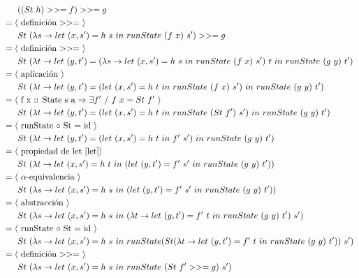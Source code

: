 \documentclass[a4paper,10pt]{article}
\begin{document}
  	\\
	\begin{align*}
  &\ \ \ \ \ ((St\ h) >>= f) >>= g
  \\ &=\langle \text{ definición $>>=$ }\rangle
  \\ &\ \ \ \ \ St\ (\lambda s \rightarrow let\ (x,s')=h\ s\ in\ runState\ (f\ x)\ s') >>= g
  \\ &=\langle \text{ definición $>>=$ }\rangle
  \\ &\ \ \ \ \ St\ (\lambda t \rightarrow let\ (y, t')=(\lambda s \rightarrow let\ (x,s')=h\ s\ in\ runState\ (f\ x)\ s')\ t\ in\ runState\ (g\ y)\ t')
  \\ &=\langle \text{ aplicación }\rangle
  \\ &\ \ \ \ \ St\ (\lambda t \rightarrow let\ (y, t')=(let\ (x,s')= h\ t\ in\ runState\ (f\ x)\ s')\ in\ runState\ (g\ y)\ t')
  \\ &=\langle \text{ f x :: State s a $\Rightarrow \exists f'\ /\  f\ x = St\ f'$ \label{sec:fxl}}\rangle
  \\ &\ \ \ \ \ St\ (\lambda t \rightarrow let\ (y, t')=(let\ (x,s')= h\ t\ in\ runState\ (St\ f')\ s')\ in\ runState\ (g\ y)\ t')
  \\ &=\langle \text{ runState $\circ$ St = id }\rangle
  \\ &\ \ \ \ \ St\ (\lambda t \rightarrow let\ (y, t')=(let\ (x,s')= h\ t\ in\ f'\ s')\ in\ runState\ (g\ y)\ t')
  \\ &=\langle \text{ propiedad de let \ref{let}}\rangle
  \\ &\ \ \ \ \ St\ (\lambda t \rightarrow let\ (x,s')= h\ t\ in\ (let\ (y, t')=f'\ s'\ in\ runState\ (g\ y)\ t'))
  \\ &=\langle \text{ $\alpha$-equivalencia }\rangle
  \\ &\ \ \ \ \ St\ (\lambda s \rightarrow let\ (x,s')= h\ s\ in\ (let\ (y, t')=f'\ s'\ in\ runState\ (g\ y)\ t'))
  \\ &=\langle \text{ abstracción }\rangle
  \\ &\ \ \ \ \ St\ (\lambda s \rightarrow let\ (x,s')= h\ s\ in\ (\lambda t\rightarrow let\ (y, t')=f'\ t\ in\ runState\ (g\ y)\ t')\ s')
  \\ &=\langle \text{ runState $\circ$ St = id }\rangle
  \\ &\ \ \ \ \ St\ (\lambda s \rightarrow let\ (x,s')= h\ s\ in\ runState (St (\lambda t\rightarrow let\ (y, t')=f'\ t\ in\ runState\ (g\ y)\ t'))\ s')
  \\ &=\langle \text{ definición $>>=$ }\rangle
  \\ &\ \ \ \ \ St\ (\lambda s \rightarrow let\ (x,s')= h\ s\ in\ runState\ (St\ f' >>= g)\ s')

\end{align*}
\end{document}
